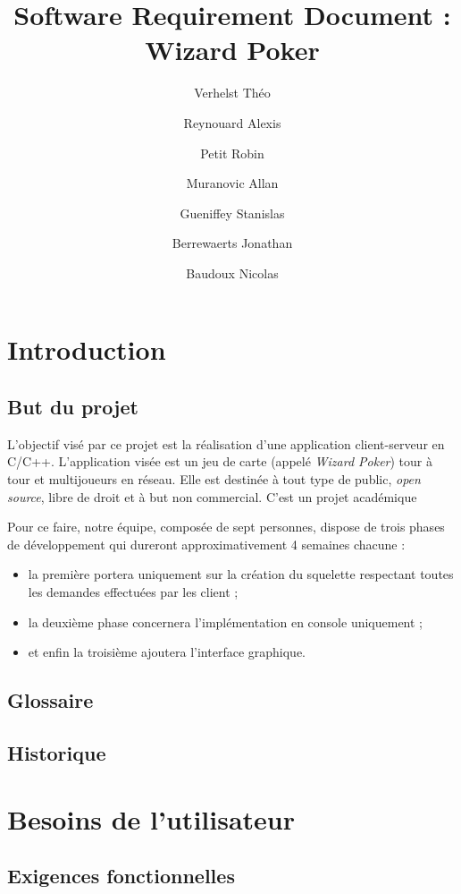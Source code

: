 \documentclass{article}
\title{Software Requirement Document : Wizard Poker}
\author{Verhelst Théo \and Reynouard Alexis \and Petit Robin \and Muranovic Allan \and Gueniffey Stanislas \and Berrewaerts Jonathan \and Baudoux Nicolas}
\begin{document}
\maketitle
\tableofcontents
\newpage
{}

\section{Introduction}
    \subsection{But du projet}
        L'objectif visé par ce projet est la réalisation d'une application client-serveur en C/C++. L'application visée est un jeu de carte (appelé
        \textit{Wizard Poker}) tour à tour et multijoueurs en réseau. Elle est destinée à tout type de public, \textit{open source}, libre de droit %
        et à but non commercial. C'est un projet académique

        Pour ce faire, notre équipe, composée de sept personnes, dispose de trois phases de développement qui dureront approximativement 4 semaines chacune :
        \begin{itemize}
            \item la première portera uniquement sur la création du squelette respectant toutes les demandes effectuées par les client ;
            \item la deuxième phase concernera l'implémentation en console uniquement ;
            \item et enfin la troisième ajoutera l'interface graphique.
        \end{itemize}

    \subsection{Glossaire}  %
        \printglossaries

    \subsection{Historique}

\section{Besoins de l'utilisateur}
    \subsection{Exigences fonctionnelles}
\end{document}
